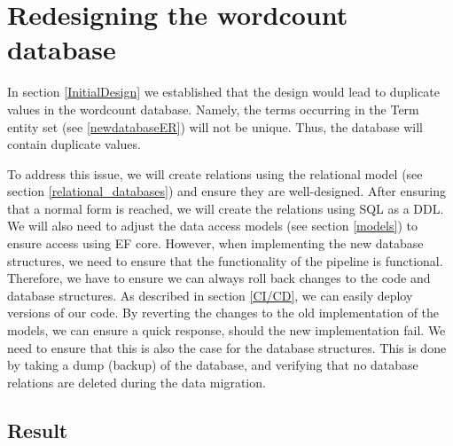 \section{Redesigning the wordcount database}
In section \ref{InitialDesign} we established that the design would lead to duplicate values in the wordcount database.
Namely, the terms occurring in the Term entity set (see \ref{newdatabaseER}) will not be unique. 
Thus, the database will contain duplicate values.
 
To address this issue, we will create relations using the relational model (see section \ref{relational_databases}) and ensure they are well-designed.
After ensuring that a normal form is reached, we will create the relations using SQL as a DDL.
We will also need to adjust the data access models (see section \ref{models}) to ensure access using EF core. However, when implementing the new database structures, we need to ensure that the functionality of the pipeline is functional. 
Therefore, we have to ensure we can always roll back changes to the code and database structures.
As described in section \ref{CI/CD}, we can easily deploy versions of our code. By reverting the changes to the old implementation of the models, we can ensure a quick response, should the new implementation fail.
We need to ensure that this is also the case for the database structures. 
This is done by taking a dump (backup) of the database, and verifying that no database relations are deleted during the data migration.




\subsection{Result}
